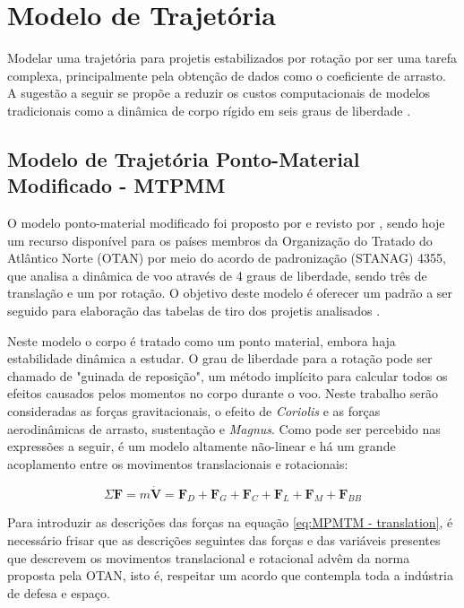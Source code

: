 \chapter{Modelo de Trajetória}\label{cap:trajetoria}
\graphicspath{{chapter-05/img-cap05/}}

Modelar uma trajetória para projetis estabilizados por rotação por ser uma tarefa complexa, principalmente pela obtenção de dados como o coeficiente de arrasto. A sugestão a seguir se propõe a reduzir os custos computacionais de modelos tradicionais como a dinâmica de corpo rígido em seis graus de liberdade \cite{McCoy2012}.

\section{Modelo de Trajetória Ponto-Material Modificado - MTPMM}
\label{subsec:MPMTM}

O modelo ponto-material modificado foi proposto por \citeauthor{Lieske1966} e revisto por \citeauthor{Baranowski2013-3}, sendo hoje um recurso disponível para os países membros da Organização do Tratado do Atlântico Norte (OTAN) \cite{stanag4355} por meio do acordo de padronização (STANAG) 4355, que analisa a dinâmica de voo através de 4 graus de liberdade, sendo três de translação e um por rotação. O objetivo deste modelo é oferecer um padrão a ser seguido para elaboração das tabelas de tiro dos projetis analisados \cite{McCoy2012,Carlucci2018}.

Neste modelo o corpo é tratado como um ponto material, embora haja estabilidade dinâmica a estudar. O grau de liberdade para a rotação pode ser chamado de "guinada de reposição", um método implícito para calcular todos os efeitos causados pelos momentos no corpo durante o voo. Neste trabalho serão consideradas as forças gravitacionais, o efeito de \textit{Coriolis} e as forças aerodinâmicas de arrasto, sustentação e \textit{Magnus}. Como pode ser percebido nas expressões a seguir, é um modelo altamente não-linear e há um grande acoplamento entre os movimentos translacionais e rotacionais:

\begin{equation}
    \label{eq:MPMTM - translation}
    \Sigma\boldsymbol{F} = m \dot{\boldsymbol{V}} = \boldsymbol{F}_{D} + \boldsymbol{F}_{G} + \boldsymbol{F}_{C} + \boldsymbol{F}_{L} + \boldsymbol{F}_{M} + \boldsymbol{F}_{BB}
\end{equation}

Para introduzir as descrições das forças na equação \ref{eq:MPMTM - translation}, é necessário frisar que as descrições seguintes das forças e das variáveis presentes que descrevem os movimentos translacional e rotacional advêm da norma proposta pela OTAN, isto é, respeitar um acordo que contempla toda a indústria de defesa e espaço.

